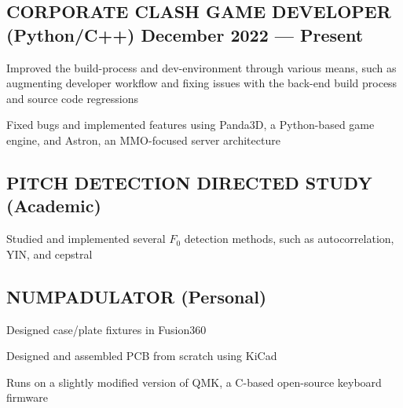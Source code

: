 \documentclass[letter,10pt]{article}
\begin{document}
\subsection{{CORPORATE CLASH GAME DEVELOPER (Python/C++)} \hfill December 2022 --- Present}
\begin{zitemize}
\item Improved the build-process and dev-environment through various means, such as augmenting developer workflow and fixing issues with the back-end build process and source code regressions
\item Fixed bugs and implemented features using Panda3D, a Python-based game engine, and Astron, an MMO-focused server architecture
\end{zitemize}

\subsection{{PITCH DETECTION DIRECTED STUDY (Academic)} \hfill {}}
\begin{zitemize}
\item Studied and implemented several $F_0$ detection methods, such as autocorrelation, YIN, and cepstral
\end{zitemize}

\subsection{{NUMPADULATOR (Personal)} \hfill {}}
\begin{zitemize}
\item Designed case/plate fixtures in Fusion360
\item Designed and assembled PCB from scratch using KiCad
\item Runs on a slightly modified version of QMK, a C-based open-source keyboard firmware
\end{zitemize}
\end{document}
